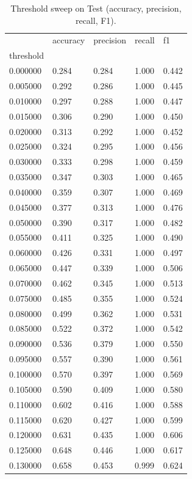 \begin{table}[htbp]
\centering
\caption{Threshold sweep on Test (accuracy, precision, recall, F1).}
\label{tab:08-threshold-sweep}
\begin{tabular}{lllll}
\toprule
 & accuracy & precision & recall & f1 \\
threshold &  &  &  &  \\
\midrule
0.000000 & 0.284 & 0.284 & 1.000 & 0.442 \\
0.005000 & 0.292 & 0.286 & 1.000 & 0.445 \\
0.010000 & 0.297 & 0.288 & 1.000 & 0.447 \\
0.015000 & 0.306 & 0.290 & 1.000 & 0.450 \\
0.020000 & 0.313 & 0.292 & 1.000 & 0.452 \\
0.025000 & 0.324 & 0.295 & 1.000 & 0.456 \\
0.030000 & 0.333 & 0.298 & 1.000 & 0.459 \\
0.035000 & 0.347 & 0.303 & 1.000 & 0.465 \\
0.040000 & 0.359 & 0.307 & 1.000 & 0.469 \\
0.045000 & 0.377 & 0.313 & 1.000 & 0.476 \\
0.050000 & 0.390 & 0.317 & 1.000 & 0.482 \\
0.055000 & 0.411 & 0.325 & 1.000 & 0.490 \\
0.060000 & 0.426 & 0.331 & 1.000 & 0.497 \\
0.065000 & 0.447 & 0.339 & 1.000 & 0.506 \\
0.070000 & 0.462 & 0.345 & 1.000 & 0.513 \\
0.075000 & 0.485 & 0.355 & 1.000 & 0.524 \\
0.080000 & 0.499 & 0.362 & 1.000 & 0.531 \\
0.085000 & 0.522 & 0.372 & 1.000 & 0.542 \\
0.090000 & 0.536 & 0.379 & 1.000 & 0.550 \\
0.095000 & 0.557 & 0.390 & 1.000 & 0.561 \\
0.100000 & 0.570 & 0.397 & 1.000 & 0.569 \\
0.105000 & 0.590 & 0.409 & 1.000 & 0.580 \\
0.110000 & 0.602 & 0.416 & 1.000 & 0.588 \\
0.115000 & 0.620 & 0.427 & 1.000 & 0.599 \\
0.120000 & 0.631 & 0.435 & 1.000 & 0.606 \\
0.125000 & 0.648 & 0.446 & 1.000 & 0.617 \\
0.130000 & 0.658 & 0.453 & 0.999 & 0.624 \\

\end{tabular}
\end{table}

